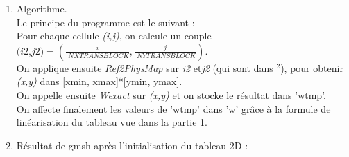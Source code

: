 \documentclass[a4paper,10pt]{article}
\begin{document}
\begin{enumerate}
\begin{enumerate}
        Le choix de la m\'ethode de linéarisation de w qui consiste \`a dire que \textit{"dans w[k*\_NXTRANSBLOCK*\_NYTRANSBLOCK + j * \_NXTRANSBLOCK + i], se trouve la composante k de la cellule (i,j)"}
        a des d\'efauts par rapport \`a une impl\'ementation du type \textit{"dans w[i*\_NXTRANSBLOCK*\_M + j*\_M + k], on trouve la composante k de [i,j]"}. \\
        Premi\`erement, c'est assez contre-intuitif, de plus ce n'est pas performant : \\
        \`A chaque \'etape, on a des formules qui nous donnent les composantes d'une cellule \textit{[x,y]} et on les stocke dans \textbf{w}. Dans la deuxi\`eme m\'ethode, on doit remplir les cases du tableau qui sont successives, alors que dans la premi\`ere m\'ethode, on doit acc\'eder \`a des cases tr\`es \'eloign\'ees du tableau. Or, lorsque l'on acc\`ede \`a une case d'un tableau, plusieurs cases successives sont charg\'ees en m\'emoire par souci d'optimisation. La deux\`eme m\'ethode permettrait donc de profiter de cette optimisation.
        \item
        Algorithme. \\
        Le principe du programme est le suivant : \\
        Pour chaque cellule \textit{(i,j)}, on calcule un couple \begin{math}\textit{(i2,j2)} = (\frac{i}{\_NXTRANSBLOCK}, \frac{j}{\_NYTRANSBLOCK}).\end{math} \\
        On applique ensuite \textit{Ref2PhysMap} sur \textit{i2} et\textit{j2} (qui sont dans \begin{math}[0,1]^2\end{math}), pour obtenir \textit{(x,y)} dans [xmin, xmax]*[ymin, ymax]. \\
        On appelle ensuite \textit{Wexact} sur \textit{(x,y)} et on stocke le r\'esultat dans 'wtmp'. \\
        On affecte finalement les valeurs de 'wtmp' dans 'w' gr\^ace \`a la formule de lin\'earisation du tableau vue dans la partie 1.
        \item
        R\'esultat de gmsh apr\`es l'initialisation du tableau 2D : \\\\

\end{enumerate}
\end{enumerate}
\end{document}
